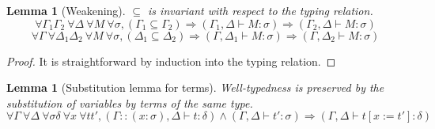 \documentclass{article}
\newtheorem{lemma}[theorem]{Lemma}
\begin{document}
    \begin{lemma}[Weakening]\label{weakening}$\subseteq$ is invariant with respect to the typing relation.
    $$\forall\Gamma_1\Gamma_2\ \forall\Delta\ \forall M\ \forall\sigma, (\Gamma_1\subseteq\Gamma_2) \Rightarrow (\Gamma_1, \Delta\vdash M : \sigma) \Rightarrow (\Gamma_2, \Delta\vdash M : \sigma)$$
    $$\forall\Gamma\ \forall\Delta_1\Delta_2\ \forall M\ \forall\sigma, (\Delta_1\subseteq\Delta_2) \Rightarrow (\Gamma, \Delta_1\vdash M : \sigma) \Rightarrow (\Gamma, \Delta_2\vdash M : \sigma)$$
    \end{lemma}
    \begin{proof}
It is straightforward by induction into the typing relation.        
    \end{proof}

    \begin{lemma}[Substitution lemma for terms]\label{Substitution lemma terms}
    Well-typedness is preserved by the substitution of variables by terms of the same type.
$$\forall \Gamma\ \forall\Delta\ \forall\sigma\delta\ \forall x \ \forall t t', (\Gamma :: (x : \sigma),\Delta\vdash t : \delta) \wedge (\Gamma,\Delta\vdash t' : \sigma) \Rightarrow (\Gamma,\Delta\vdash t[x:=t'] : \delta)$$        
    \end{lemma}
\end{document}
